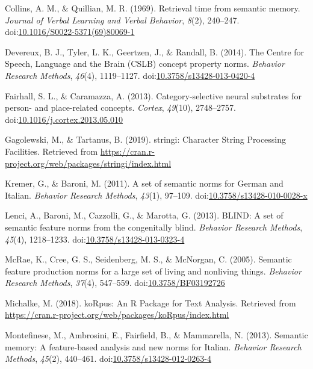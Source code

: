 \documentclass[man]{apa6}
\begin{document}
\leavevmode\hypertarget{ref-Collins1969}{}%
Collins, A. M., \& Quillian, M. R. (1969). Retrieval time from semantic memory. \emph{Journal of Verbal Learning and Verbal Behavior}, \emph{8}(2), 240--247. doi:\href{https://doi.org/10.1016/S0022-5371(69)80069-1}{10.1016/S0022-5371(69)80069-1}

\leavevmode\hypertarget{ref-Devereux2014}{}%
Devereux, B. J., Tyler, L. K., Geertzen, J., \& Randall, B. (2014). The Centre for Speech, Language and the Brain (CSLB) concept property norms. \emph{Behavior Research Methods}, \emph{46}(4), 1119--1127. doi:\href{https://doi.org/10.3758/s13428-013-0420-4}{10.3758/s13428-013-0420-4}

\leavevmode\hypertarget{ref-Fairhall2013}{}%
Fairhall, S. L., \& Caramazza, A. (2013). Category-selective neural substrates for person- and place-related concepts. \emph{Cortex}, \emph{49}(10), 2748--2757. doi:\href{https://doi.org/10.1016/j.cortex.2013.05.010}{10.1016/j.cortex.2013.05.010}

\leavevmode\hypertarget{ref-Gagolewski2019}{}%
Gagolewski, M., \& Tartanus, B. (2019). stringi: Character String Processing Facilities. Retrieved from \url{https://cran.r-project.org/web/packages/stringi/index.html}

\leavevmode\hypertarget{ref-Kremer2011a}{}%
Kremer, G., \& Baroni, M. (2011). A set of semantic norms for German and Italian. \emph{Behavior Research Methods}, \emph{43}(1), 97--109. doi:\href{https://doi.org/10.3758/s13428-010-0028-x}{10.3758/s13428-010-0028-x}

\leavevmode\hypertarget{ref-Lenci2013}{}%
Lenci, A., Baroni, M., Cazzolli, G., \& Marotta, G. (2013). BLIND: A set of semantic feature norms from the congenitally blind. \emph{Behavior Research Methods}, \emph{45}(4), 1218--1233. doi:\href{https://doi.org/10.3758/s13428-013-0323-4}{10.3758/s13428-013-0323-4}

\leavevmode\hypertarget{ref-McRae2005}{}%
McRae, K., Cree, G. S., Seidenberg, M. S., \& McNorgan, C. (2005). Semantic feature production norms for a large set of living and nonliving things. \emph{Behavior Research Methods}, \emph{37}(4), 547--559. doi:\href{https://doi.org/10.3758/BF03192726}{10.3758/BF03192726}

\leavevmode\hypertarget{ref-Michalke2018}{}%
Michalke, M. (2018). koRpus: An R Package for Text Analysis. Retrieved from \url{https://cran.r-project.org/web/packages/koRpus/index.html}

\leavevmode\hypertarget{ref-Montefinese2013}{}%
Montefinese, M., Ambrosini, E., Fairfield, B., \& Mammarella, N. (2013). Semantic memory: A feature-based analysis and new norms for Italian. \emph{Behavior Research Methods}, \emph{45}(2), 440--461. doi:\href{https://doi.org/10.3758/s13428-012-0263-4}{10.3758/s13428-012-0263-4}
\end{document}
